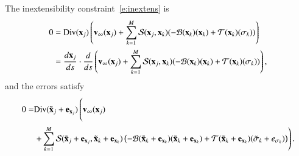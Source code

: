 The inextensibility constraint~\eqref{e:inextens} is
\begin{equation}
\begin{aligned}
  0&=\mathrm{Div}({\mathbf{x}}_{j})\left({\mathbf{v}}_{\infty}({\mathbf{x}}_{j})
    +\sum_{k=1}^{M} {\mathcal{S}}({\mathbf{x}}_{j},{\mathbf{x}}_{k})(
    -{\mathcal{B}}({\mathbf{x}}_{k})({\mathbf{x}}_{k}) + {\mathcal{T}}({\mathbf{x}}_{k})(\sigma_{k}))\right) \\
  &=\frac{d{\mathbf{x}}_{j}}{ds} \cdot \frac{d}{ds}\left({\mathbf{v}}_{\infty}({\mathbf{x}}_{j})
    +\sum_{k=1}^{M} {\mathcal{S}}({\mathbf{x}}_{j},{\mathbf{x}}_{k})(
    -{\mathcal{B}}({\mathbf{x}}_{k})({\mathbf{x}}_{k}) + {\mathcal{T}}({\mathbf{x}}_{k})(\sigma_{k}))\right),
\end{aligned}
\label{e:inextensMethod1}
\end{equation}
and the errors satisfy
\begin{align}
  0=&\Div(\txx{j}+\exx{j})\left(\vphantom{\sum_{k=1}^{M}} 
    \vv_{\infty}(\xx_{j}) \right. \nonumber \\
  &\left. + \sum_{k=1}^{M} \SS(\txx{j}+\exx{j},\txx{k}+\exx{k})\left(
    -\BB(\txx{k}+\exx{k})(\txx{k}+\exx{k}) + 
    \TT(\txx{k}+\exx{k})(\tsigma{k}+\esigma{k})\right)\right).
  \label{e:inextensUpdateMethod1}
\end{align}

